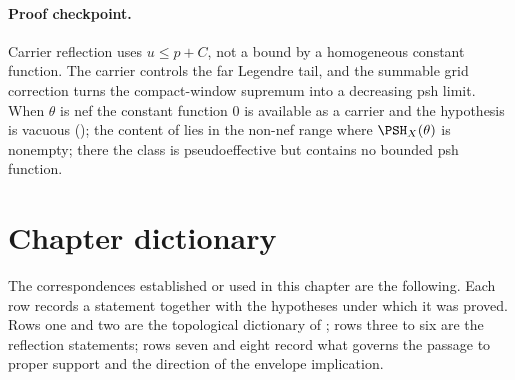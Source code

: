 \paragraph{Proof checkpoint.}
Carrier reflection uses $u\le p+C$, not a bound by a homogeneous constant
function.  The carrier controls the far Legendre tail, and the summable grid
correction turns the compact-window supremum into a decreasing psh limit.
When $\theta$ is nef the constant function $0$ is available as a
carrier and the hypothesis is vacuous
(); the content of
 lies in the non-nef range where
$\PSH_X(\theta)$ is nonempty; there the class is pseudoeffective but
contains no bounded psh function.

\section{Chapter dictionary}
\label{sec:ch39-dictionary}

The correspondences established or used in this chapter are the following.
Each row records a statement together with the hypotheses under which it was
proved.  Rows one and two are the topological dictionary of
; rows three to six are the reflection
statements; rows seven and eight record what governs the passage to proper
support and the direction of the envelope implication.

